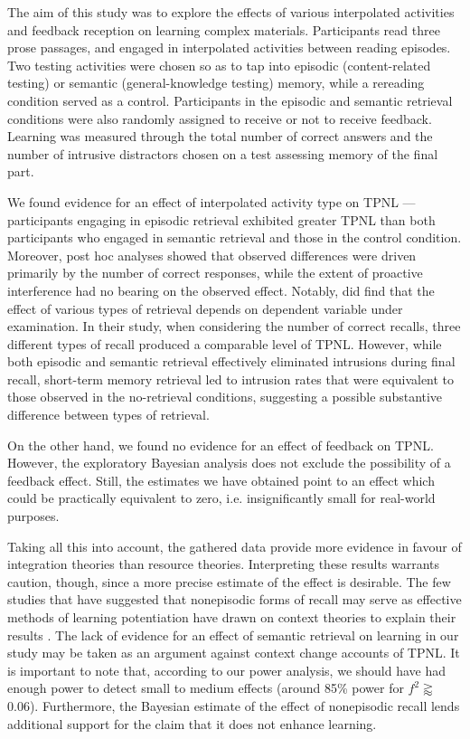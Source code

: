 \documentclass[../main.tex]{subfiles}
\begin{document}
	
The aim of this study was to explore the effects of various interpolated 
activities and feedback reception on learning complex materials. Participants 
read three prose passages, and engaged in interpolated activities between 
reading episodes. Two testing activities were chosen so as to tap into episodic 
(content-related testing) or semantic (general-knowledge testing) memory, while 
a rereading condition served as a control. Participants in the episodic and 
semantic retrieval conditions were also randomly assigned to receive or not to 
receive feedback. Learning was measured through the total number of correct 
answers and the number of intrusive distractors chosen on a test assessing 
memory of the final part.

We found evidence for an effect of interpolated activity type on TPNL --- 
participants engaging in episodic retrieval exhibited greater TPNL than both 
participants who engaged in semantic retrieval and those in the control 
condition. Moreover, post hoc analyses showed that observed differences were 
driven primarily by the number of correct responses, while the extent of 
proactive interference had no bearing on the observed effect. Notably, 
\cite{pastotterRetrievalLearningFacilitates2011} did find that the effect of 
various types of retrieval depends on dependent variable under examination. 
In their study, when considering the number of correct recalls, three different 
types of recall produced a comparable level of TPNL. However, while both 
episodic and semantic retrieval effectively eliminated intrusions during final 
recall, short-term memory retrieval led to intrusion rates that were equivalent 
to those observed in the  no-retrieval conditions, suggesting a possible 
substantive difference between types of retrieval.

On the other hand, we found no evidence for an effect of feedback on TPNL. 
However, the exploratory Bayesian analysis does not exclude the possibility of 
a feedback effect. Still, the estimates we have obtained point to an effect 
which could be practically equivalent to zero, i.e. insignificantly small for 
real-world purposes.

Taking all this into account, the gathered data provide more evidence in
favour of integration theories than resource theories. Interpreting these 
results warrants caution, though, since a more precise estimate of the effect 
is desirable. The few studies that have suggested that nonepisodic forms of 
recall may serve as effective methods of learning potentiation have drawn on 
context theories to explain their results 
\citep{divisRetrievalSpeedsContext2014, 
pastotterRetrievalLearningFacilitates2011}.
The lack of evidence for an effect of semantic retrieval on learning in our 
study may be taken as an argument against context change accounts of TPNL. It 
is important to note that, according to our power analysis, we should have had 
enough power to detect small to medium effects (around 85\% power for \(f^2 
\gtrapprox\) 0.06). Furthermore, the Bayesian estimate of the effect of 
nonepisodic recall lends additional support for the claim that it does not
enhance learning.
\end{document}
